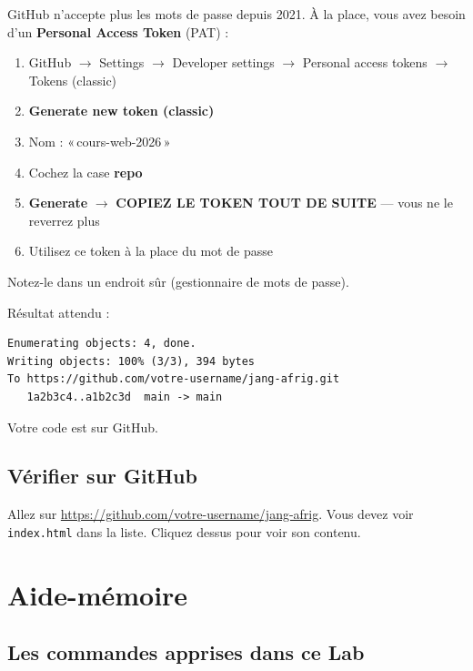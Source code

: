\documentclass[11pt,a4paper]{article}
\newcommand{\cmark}{\ding{51}}
\begin{document}
\begin{attentionbox}
GitHub n'accepte plus les mots de passe depuis 2021. À la place, vous avez
besoin d'un \textbf{Personal Access Token} (PAT) :

\begin{enumerate}[nosep]
    \item GitHub $\to$ Settings $\to$ Developer settings $\to$ Personal access tokens $\to$ Tokens (classic)
    \item \textbf{Generate new token (classic)}
    \item Nom : «\,cours-web-2026\,»
    \item Cochez la case \textbf{repo}
    \item \textbf{Generate} $\to$ \textbf{COPIEZ LE TOKEN TOUT DE SUITE} --- vous ne le reverrez plus
    \item Utilisez ce token à la place du mot de passe
\end{enumerate}

Notez-le dans un endroit sûr (gestionnaire de mots de passe).
\end{attentionbox}

Résultat attendu :
\begin{lstlisting}
Enumerating objects: 4, done.
Writing objects: 100% (3/3), 394 bytes
To https://github.com/votre-username/jang-afrig.git
   1a2b3c4..a1b2c3d  main -> main
\end{lstlisting}

\cmark{} Votre code est sur GitHub.

\subsection{Vérifier sur GitHub}

Allez sur \url{https://github.com/votre-username/jang-afrig}. Vous devez
voir \texttt{index.html} dans la liste. Cliquez dessus pour voir son contenu.

\newpage

\section{Aide-mémoire}

\subsection{Les commandes apprises dans ce Lab}
\end{document}
